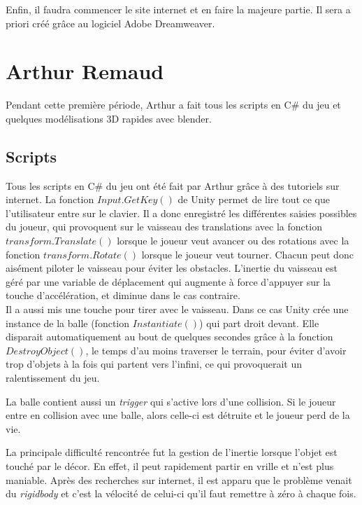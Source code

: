\documentclass[10pt, titlepage]{report}
\begin{document}
Enfin, il faudra commencer le site internet et en faire la majeure partie. Il sera a priori créé grâce au logiciel Adobe Dreamweaver.


\section{Arthur Remaud}
Pendant cette première période, Arthur a fait tous les scripts en C\# du jeu et quelques modélisations 3D rapides avec blender.

\subsection{Scripts}

Tous les scripts en C\# du jeu ont été fait par Arthur grâce à des tutoriels sur internet. La fonction $Input.GetKey()$ de Unity permet de lire tout ce que l'utilisateur entre sur le clavier. Il a donc enregistré les différentes saisies possibles du joueur, qui provoquent sur le vaisseau des translations avec la fonction $transform.Translate()$ lorsque le joueur veut avancer ou des rotations avec la fonction $transform.Rotate()$ lorsque le joueur veut tourner. Chacun peut donc aisément piloter le vaisseau pour éviter les obstacles. L'inertie du vaisseau est géré par une variable de déplacement qui augmente à force d'appuyer sur la touche d'accélération, et diminue dans le cas contraire.\\

Il a aussi mis une touche pour tirer avec le vaisseau. Dans ce cas Unity crée une instance de la balle (fonction $Instantiate()$) qui part droit devant. Elle disparait automatiquement au bout de quelques secondes grâce à la fonction $DestroyObject()$, le temps d'au moins traverser le terrain, pour éviter d'avoir trop d'objets à la fois qui partent vers l'infini, ce qui provoquerait un ralentissement du jeu.

La balle contient aussi un \textit{trigger} qui s'active lors d'une collision. Si le joueur entre en collision avec une balle, alors celle-ci est détruite et le joueur perd de la vie.

La principale difficulté rencontrée fut la gestion de l'inertie lorsque l'objet est touché par le décor. En effet, il peut rapidement partir en vrille et n'est plus maniable. Après des recherches sur internet, il est apparu que le problème venait du \textit{rigidbody} et c'est la vélocité de celui-ci qu'il faut remettre à zéro à chaque fois.\\ \\
\end{document}

